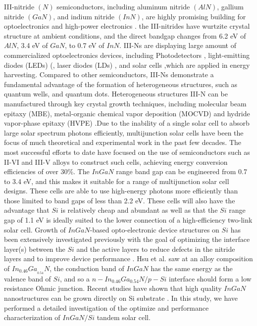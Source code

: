 \documentclass[preprint,12pt]{elsarticle}
\begin{document}
III-nitride $(N)$ semiconductors, including aluminum nitride $(AlN)$, gallium nitride $(GaN)$, and indium nitride $(InN)$, are highly promising building for optoelectronics and high-power electronics \cite{strite1992gan}. the III-nitrides have wurtzite crystal structure at ambient conditions, and the direct bandgap changes from 6.2 eV of $AlN$, 3.4 eV of $GaN$, to 0.7 eV of $InN$. III-Ns are displaying large amount of commercialized optoelectronics devices, including Photodetectors \cite{pernot2000solar,chen1997schottky,munoz1997photoconductor}, light-emitting diodes (LEDs) (\cite{nakamura1993high,funato2006blue,iso2007high}, laser diodes (LDs) \cite{nakamura1998continuous}, and solar cells \cite{neufeld2008high,jani2007design,jiang2017enhanced},which are applied in energy harvesting. Compared to other semiconductors, III-Ns demonstrate a fundamental advantage of the formation of heterogeneous structures, such as quantum wells, and  quantum dots. Heterogeneous structures III-N can be manufactured through key crystal growth techniques, including molecular beam epitaxy (MBE), metal-organic chemical vapor deposition (MOCVD) and hydride vapor-phase epitaxy (HVPE) \cite{jain2000iii,yoshida1982properties,li2007influence}.Due to the inability of a single solar cell to absorb large solar spectrum photons efficiently, multijunction solar cells have been the focus of much theoretical and experimental work in the past few decades. The most successful efforts to date have focused on the use of semiconductors such as II-VI and III-V alloys to construct such cells, achieving energy conversion efficiencies of over 30\%. The $InGaN$ range band gap can be engineered from 0.7 to 3.4 eV, and this makes it suitable for a range of multijunction solar cell designs. These cells are able to use high-energy photons more efficiently than those limited to band gaps of less than 2.2 eV. These cells will also have the advantage that $Si$ is relatively cheap and abundant as well as that the $Si$ range gap of 1.1 eV is ideally suited to the lower connection of a high-efficiency two-link solar cell. Growth of $InGaN$-based opto-electronic device structures on $Si$ has been extensively investigated previously with the goal of optimizing the interface layer(s) between the $Si$ and the active layers to reduce defects in the nitride layers and to improve device performance . Hsu et al.\cite{hsu2008modeling} saw at an alloy composition of $In_{0.46}Ga_{_{0.54}}N$, the conduction band of $InGaN$ has the same energy as the valence band of $Si$, and so a $n-In_{0.46}Ga_{0.54}N/p-Si$ interface should form a low resistance Ohmic junction. Recent studies have shown that high quality $InGaN$ nanostructures can be grown directly on Si substrate \cite{arafin2013review, wang2019in0}. In this study, we have performed a detailed investigation of the optimize and performance characterization of $InGaN/Si$ tandem solar cell.
\end{document}
